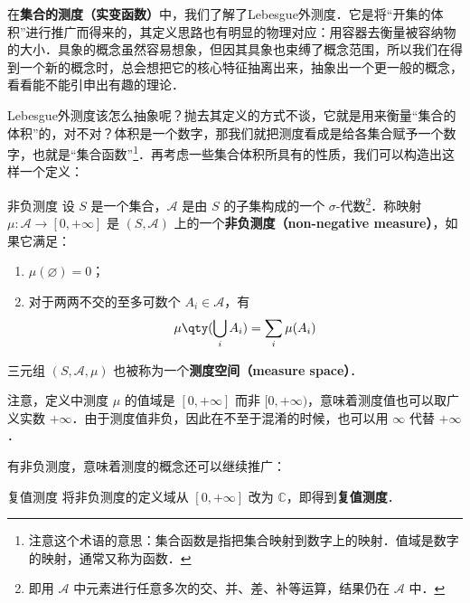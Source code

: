 

在\textbf{集合的测度（实变函数）}中，我们了解了Lebesgue外测度．它是将“开集的体积”进行推广而得来的，其定义思路也有明显的物理对应：用容器去衡量被容纳物的大小．具象的概念虽然容易想象，但因其具象也束缚了概念范围，所以我们在得到一个新的概念时，总会想把它的核心特征抽离出来，抽象出一个更一般的概念，看看能不能引申出有趣的理论．

Lebesgue外测度该怎么抽象呢？抛去其定义的方式不谈，它就是用来衡量“集合的体积”的，对不对？体积是一个数字，那我们就把测度看成是给各集合赋予一个数字，也就是“集合函数”\footnote{注意这个术语的意思：集合函数是指把集合映射到数字上的映射．值域是数字的映射，通常又称为函数．}．再考虑一些集合体积所具有的性质，我们可以构造出这样一个定义：

\begin{definition}{非负测度}\label{GenFun_def1}
设 $S$ 是一个集合，$\mathcal{A}$ 是由 $S$ 的子集构成的一个 $\sigma$-代数\footnote{即用 $\mathcal{A}$ 中元素进行任意多次的交、并、差、补等运算，结果仍在 $\mathcal{A}$ 中．}．称映射 $\mu:\mathcal{A}\to [0, +\infty]$ 是 $(S, \mathcal{A})$ 上的一个\textbf{非负测度（non-negative measure）}，如果它满足：
\begin{enumerate}
\item $\mu(\varnothing)=0$；\\
\item 对于两两不交的至多可数个 $A_i\in\mathcal{A}$，有
\begin{equation}
\mu\qty(\bigcup_i A_i) = \sum_i \mu(A_i)
\end{equation}
\end{enumerate}


三元组 $(S, \mathcal{A}, \mu)$ 也被称为一个\textbf{测度空间（measure space）}．

\end{definition}

注意，定义中测度 $\mu$ 的值域是 $[0, +\infty]$ 而非 $[0, +\infty)$，意味着测度值也可以取广义实数 $+\infty$．由于测度值非负，因此在不至于混淆的时候，也可以用 $\infty$ 代替 $+\infty$．

有非负测度，意味着测度的概念还可以继续推广：

\begin{definition}{复值测度}
将非负测度的定义域从 $[0, +\infty]$ 改为 $\mathbb{C}$，即得到\textbf{复值测度}．
\end{definition}

